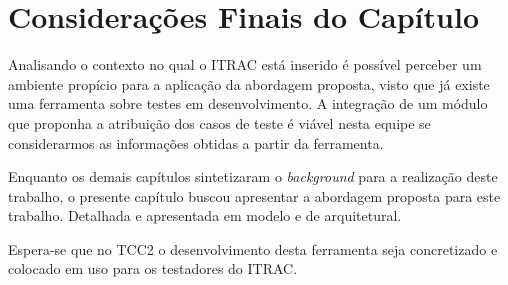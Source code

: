 \section{Considerações Finais do Capítulo}
\label{sec:final-cap}

Analisando o contexto no qual o ITRAC está inserido é possível perceber um ambiente propício para a aplicação da abordagem proposta, visto que já existe uma ferramenta sobre testes em desenvolvimento. A integração de um módulo que proponha a atribuição dos casos de teste é viável nesta equipe se considerarmos as informações obtidas a partir da ferramenta.

Enquanto os demais capítulos sintetizaram o \textit{background} para a realização deste trabalho, o presente capítulo buscou apresentar a abordagem proposta para este trabalho. Detalhada e apresentada em modelo e de arquitetural. 

Espera-se que no TCC2 o desenvolvimento desta ferramenta seja concretizado e colocado em uso para os testadores do ITRAC. 
